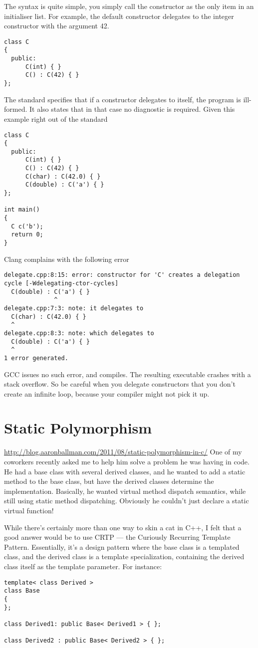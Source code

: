 \documentclass{book}
\begin{document}
The syntax is quite simple, you simply call the constructor as the only item in an initialiser list.
For example, the default constructor delegates to the integer constructor with the argument 42.
\begin{lstlisting}
class C
{
  public:
      C(int) { }
      C() : C(42) { }
};
\end{lstlisting}
The standard specifies that if a constructor delegates to itself, the program is ill-formed. It also states that in that case no diagnostic is required.
Given this example right out of the standard
\begin{lstlisting}
class C
{
  public:
      C(int) { }
      C() : C(42) { }
      C(char) : C(42.0) { }
      C(double) : C('a') { }
};
 
int main()
{
  C c('b');
  return 0;
}
\end{lstlisting}
Clang complains with the following error
\begin{verbatim}
delegate.cpp:8:15: error: constructor for 'C' creates a delegation cycle [-Wdelegating-ctor-cycles]
  C(double) : C('a') { }
              ^
delegate.cpp:7:3: note: it delegates to
  C(char) : C(42.0) { }
  ^
delegate.cpp:8:3: note: which delegates to
  C(double) : C('a') { }
  ^
1 error generated.
\end{verbatim}
GCC issues no such error, and compiles. The resulting executable crashes with a stack overflow.
So be careful when you delegate constructors that you don’t create an infinite loop, because your compiler might not pick it up.

\chapter{Static Polymorphism}\label{stp}\mbox{}
\url{http://blog.aaronballman.com/2011/08/static-polymorphism-in-c/}
One of my coworkers recently asked me to help him solve a problem he was having in code.
He had a base class with several derived classes, and he wanted to add a static method to the base class, but have the derived classes determine the implementation.
Basically, he wanted virtual method dispatch semantics, while still using static method dispatching. Obviously he couldn’t just declare a static virtual function!

While there’s certainly more than one way to skin a cat in C++, I felt that a good answer would be to use CRTP — the Curiously Recurring Template Pattern.
Essentially, it’s a design pattern where the base class is a templated class, and the derived class is a template specialization, containing the derived class itself as the template parameter.
For instance:
\begin{lstlisting}
template< class Derived >
class Base 
{ 
};
 
class Derived1: public Base< Derived1 > { };
 
class Derived2 : public Base< Derived2 > { };
\end{lstlisting}
\end{document}
